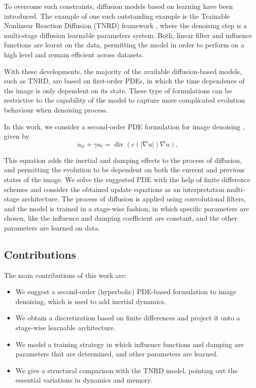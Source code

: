 \documentclass[conference]{IEEEtran}
\begin{document}
To overcome such constraints, diffusion models based on learning 
have been introduced. The example of one such outstanding example is the 
Trainable Nonlinear Reaction Diffusion (TNRD) framework \cite{chen2016tnrd},
where the denoising step is a multi-stage diffusion 
learnable parameters system. Both, linear filter and influence functions are learnt on the data, permitting the model in order to perform on a high level and remain efficient across datasets.

With these developments, the majority of the available diffusion-based models, such as TNRD, are based on first-order PDEs, in which the time dependence of the image is only dependent on its state. These type of formulations can be restrictive to the capability of the model to capture more complicated evolution behaviour when denoising process.

In this work, we consider a second-order PDE formulation for image denoising \cite{majee2020telegraph}, given by
\begin{equation}
u_{tt} + \gamma u_t = \operatorname{div}(c(|\nabla u|)\nabla u),
\end{equation}

This equation adds the inertial and damping effects to the process of diffusion, and permitting the evolution to be dependent on both the current and previous states of the image. We solve the suggested PDE with the help of finite difference schemes and consider the obtained update equations as an interpretation multi-stage architecture. The process of diffusion is applied using convolutional filters, and the model is trained in a
stage-wise fashion, in which specific parameters are chosen, like the influence and damping coefficient are constant, and the other parameters are learned on data.

\subsection{Contributions}

The main contributions of this work are:
\begin{itemize}
\item We suggest a second-order (hyperbolic) PDE-based formulation to image denoising, which is used to add inertial dynamics. 
\item We obtain a discretization based on finite differences and project it onto a stage-wise learnable architecture.
\item We model a training strategy in which influence functions and damping are parameters that are determined, and other parameters are learned.
\item We give a structural comparison with the TNRD model, pointing out the essential variations in dynamics and memory.
\end{itemize}
\end{document}
